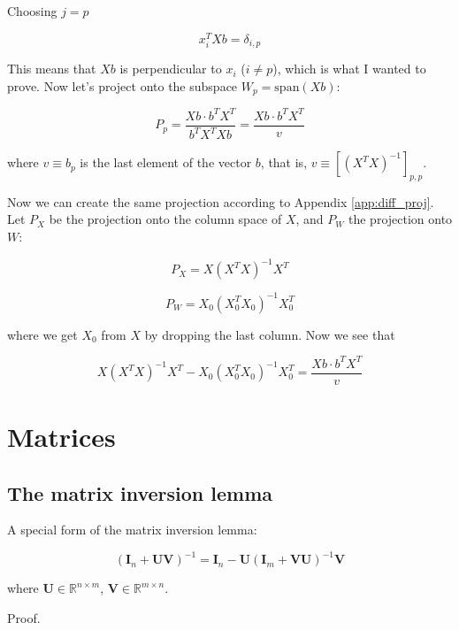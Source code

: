 \documentclass{article}
\begin{document}
\begin{appendices}
Choosing $j=p$

\begin{equation}
    x^T_i X b = \delta_{i,p}
\end{equation}

This means that $Xb$ is perpendicular to $x_i$ ($i \neq p$), which is what I wanted to prove. Now let's project onto the subspace $W_p = \text{span}(Xb)$:

\begin{equation}
    P_{p} = \frac{Xb\cdot b^TX^T}{b^TX^TXb} = \frac{Xb\cdot b^TX^T}{v}
\end{equation}

where $v \equiv b_p$ is the last element of the vector $b$, that is, $v\equiv [(X^TX)^{-1}]_{p,p}$.

Now we can create the same projection according to Appendix \ref{app:diff_proj}. Let $P_X$ be the projection onto the column space of $X$, and $P_W$ the projection onto $W$:

\begin{equation}
    P_X = X (X^TX)^{-1} X^T
\end{equation}

\begin{equation}
    P_W = X_0 (X^T_0 X_0)^{-1} X^T_0
\end{equation}

where we get $X_0$ from $X$ by dropping the last column. Now we see that

\begin{equation}
    X (X^TX)^{-1} X^T - X_0 (X^T_0 X_0)^{-1} X^T_0 = \frac{Xb\cdot b^TX^T}{v}
\end{equation}

\section{Matrices}

\subsection{The matrix inversion lemma}\label{app:matrix_inv_lemma}

A special form of the matrix inversion lemma:

\[
(\bm{I}_n + \bm{U}\bm{V})^{-1} = \bm{I}_n - \bm{U}(\bm{I}_m + \bm{V}\bm{U})^{-1}\bm{V}
\]

where $\bm{U} \in \mathbb{R}^{n\times m}$, $\bm{V} \in \mathbb{R}^{m\times n}$.

Proof.


\end{appendices}
\end{document}
